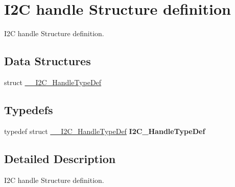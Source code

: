 \hypertarget{group___i2_c__handle___structure__definition}{}\section{I2C handle Structure definition}
\label{group___i2_c__handle___structure__definition}


I2C handle Structure definition.  


\subsection*{Data Structures}
\begin{DoxyCompactItemize}
\item 
struct \hyperlink{struct_____i2_c___handle_type_def}{\+\_\+\+\_\+\+I2\+C\+\_\+\+Handle\+Type\+Def}
\end{DoxyCompactItemize}
\subsection*{Typedefs}
\begin{DoxyCompactItemize}
\item 
\mbox{\label{group___i2_c__handle___structure__definition_ga68e9f45c2fd2161fb827ccdeabb55ea5}} 
typedef struct \hyperlink{struct_____i2_c___handle_type_def}{\+\_\+\+\_\+\+I2\+C\+\_\+\+Handle\+Type\+Def} {\bfseries I2\+C\+\_\+\+Handle\+Type\+Def}
\end{DoxyCompactItemize}


\subsection{Detailed Description}
I2C handle Structure definition. 

